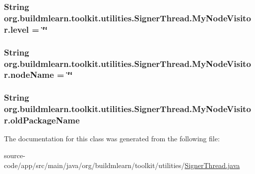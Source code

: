 \subsubsection[{\texorpdfstring{level}{level}}]{\setlength{\rightskip}{0pt plus 5cm}String org.\+buildmlearn.\+toolkit.\+utilities.\+Signer\+Thread.\+My\+Node\+Visitor.\+level = \char`\"{}\char`\"{}\hspace{0.3cm}{\ttfamily [static]}}\hypertarget{classorg_1_1buildmlearn_1_1toolkit_1_1utilities_1_1SignerThread_1_1MyNodeVisitor_a9069a03514616d36f34648b515d7cb53}{}\label{classorg_1_1buildmlearn_1_1toolkit_1_1utilities_1_1SignerThread_1_1MyNodeVisitor_a9069a03514616d36f34648b515d7cb53}
\subsubsection[{\texorpdfstring{node\+Name}{nodeName}}]{\setlength{\rightskip}{0pt plus 5cm}String org.\+buildmlearn.\+toolkit.\+utilities.\+Signer\+Thread.\+My\+Node\+Visitor.\+node\+Name = \char`\"{}\char`\"{}}\hypertarget{classorg_1_1buildmlearn_1_1toolkit_1_1utilities_1_1SignerThread_1_1MyNodeVisitor_a381105acceb26ff48a41195c7eee0464}{}\label{classorg_1_1buildmlearn_1_1toolkit_1_1utilities_1_1SignerThread_1_1MyNodeVisitor_a381105acceb26ff48a41195c7eee0464}
\subsubsection[{\texorpdfstring{old\+Package\+Name}{oldPackageName}}]{\setlength{\rightskip}{0pt plus 5cm}String org.\+buildmlearn.\+toolkit.\+utilities.\+Signer\+Thread.\+My\+Node\+Visitor.\+old\+Package\+Name\hspace{0.3cm}{\ttfamily [static]}}\hypertarget{classorg_1_1buildmlearn_1_1toolkit_1_1utilities_1_1SignerThread_1_1MyNodeVisitor_a9ed543fd9c4c2364c14288380e0f6ebe}{}\label{classorg_1_1buildmlearn_1_1toolkit_1_1utilities_1_1SignerThread_1_1MyNodeVisitor_a9ed543fd9c4c2364c14288380e0f6ebe}


The documentation for this class was generated from the following file\+:\begin{DoxyCompactItemize}
\item 
source-\/code/app/src/main/java/org/buildmlearn/toolkit/utilities/\hyperlink{SignerThread_8java}{Signer\+Thread.\+java}\end{DoxyCompactItemize}
